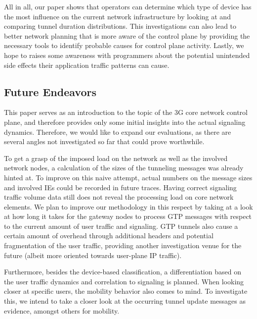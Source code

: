 All in all, our paper shows that operators can determine which type of device has the most influence on the current network infrastructure by looking at and comparing tunnel duration distributions. %
This investigations can also lead to better network planning that is more aware of the control plane by providing the necessary tools to identify probable causes for control plane activity. Lastly, we hope to raises some awareness with programmers about the potential unintended side effects their application traffic patterns can cause.

\subsection{Future Endeavors}

This paper serves as an introduction to the topic of the 3G core network control plane, and therefore provides only some initial insights into the actual signaling dynamics. Therefore, we would like to expand our evaluations, as there are several  angles not investigated so far that could prove worthwhile.

To get a grasp of the imposed load on the network as well as the involved network nodes, a calculation of the sizes of the tunneling messages was already hinted at. To improve on this naive attempt, actual numbers on the message sizes and involved \acp{IE} could be recorded in future traces. Having correct signaling traffic volume data still does not reveal the processing load on core network elements. We plan to improve our methodology in this respect by taking at a look at how long it takes for the gateway nodes to process \ac{GTP} messages with respect to the current amount of user traffic and signaling. \ac{GTP} tunnels also cause a certain amount of overhead through additional headers and potential fragmentation of the user traffic, providing another investigation venue for the future (albeit more oriented towards user-plane IP traffic). 

Furthermore, besides the device-based classification, a differentiation based on the user traffic dynamics and correlation to signaling is planned. When looking closer at specific users, the mobility behavior also comes to mind. To investigate this, we intend to take a closer look at the occurring tunnel update messages as evidence, amongst others for mobility.

